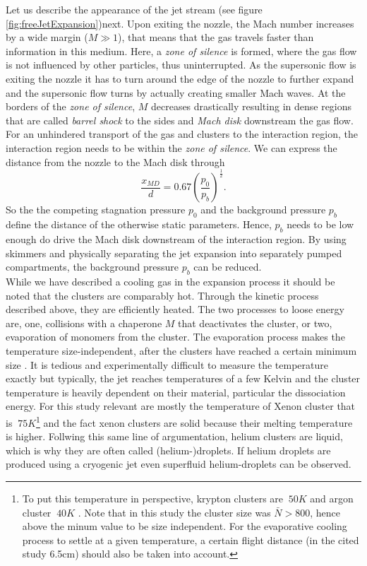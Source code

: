 Let us describe the appearance of the jet stream (see figure \ref{fig:freeJetExpansion})next. Upon exiting the nozzle, the Mach number increases by a wide margin ($M\gg 1$), that means that the gas travels faster than information in this medium. Here, a \textit{zone of silence} is formed, where the gas flow is not influenced by other particles, thus uninterrupted. As the supersonic flow is exiting the nozzle it has to turn around the edge of the nozzle to further expand and the supersonic flow turns by actually creating smaller Mach waves. At the borders of the \textit{zone of silence}, $M$ decreases drastically resulting in dense regions that are called \textit{barrel shock} to the sides and \textit{Mach disk} downstream the gas flow. For an unhindered transport of the gas and clusters to the interaction region, the interaction region needs to be within the \textit{zone of silence}. We can express the distance from the nozzle to the Mach disk through
\begin{equation}
\frac{x_{MD}}{d}=0.67\left(\frac{p_{0}}{p_{b}}\right)^{\frac{1}{2}}.
\label{eq:distance-of-mach-disk}
\end{equation}
So the the competing stagnation pressure $p_{0}$ and the background pressure $p_{b}$ define the distance of the otherwise static parameters. Hence, $p_{b}$ needs to be low enough do drive the Mach disk downstream of the interaction region. By using skimmers and physically separating the jet expansion into separately pumped compartments, the background pressure $p_{b}$ can be reduced.\\
While we have described a cooling gas in the expansion process it should be noted that the clusters are comparably hot. Through the kinetic process described above, they are efficiently heated. The two processes to loose energy are, one, collisions with a chaperone $M$ that deactivates the cluster, or two, evaporation of monomers from the cluster. The evaporation process makes the temperature size-independent, after the clusters have reached a certain minimum size \cite{Farges-1981-SurfSci}. It is tedious and experimentally difficult to measure the temperature exactly but typically, the jet reaches temperatures of a few Kelvin and the cluster temperature is heavily dependent on their material, particular the dissociation energy. For this study relevant are mostly the temperature of Xenon cluster that is $~75K$\footnote{To put this temperature in perspective, krypton clusters are $~50K$ and argon cluster $~40K$ \cite{Farges-1981-SurfSci,Gspann-1986-Springer}. Note that in this study the cluster size was $\bar{N} > 800$, hence above the minum value to be size independent. For the evaporative cooling process to settle at a given temperature, a certain flight distance (in the cited study 6.5cm) should also be taken into account.} and the fact xenon clusters are solid because their melting temperature is higher\cite{Gspann-1986-Springer}. Follwing this same line of argumentation, helium clusters are liquid, which is why they are often called (helium-)droplets. If helium droplets are produced using a cryogenic jet even superfluid helium-droplets can be observed.\\

